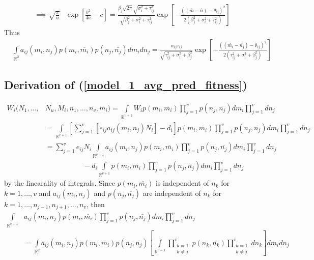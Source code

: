\documentclass{amsart}
\theoremstyle{definition}
\theoremstyle{remark}
\numberwithin{equation}{section}
\begin{document}
\begin{align*}
	\implies \sqrt{\frac{\pi}{a}}&\exp\left[\frac{b^2}{4a} - c\right] = \frac{\beta_j\sqrt{2\pi}\sqrt{\sigma_i^2 + \tau_{ij}^2}}{\sqrt{\beta_j^2 + \sigma_i^2 + \tau_{ij}^2}}\exp\left[-\frac{((\overline{m} - \overline{n}) - \theta_{ij})^2}{2(\beta_j^2 + \sigma_i^2 + \tau_{ij}^2)}\right]
\end{align*}
Thus
\begin{align*}
	&\int\limits_{\mathbb{R}^2}a_{ij}(m_i, n_j)p(m_i, \overline{m_i})p(n_j, \overline{n_j})dm_idn_j = \frac{\alpha_{ij}\tau_{ij}}{\sqrt{\tau_{ij}^2 + \sigma_i^2 + \beta_j^2}}\exp{\left[-\frac{((\overline{m_i} - \overline{n_j}) - \theta_{ij})^2}{2(\tau_{ij}^2 + \sigma_i^2 + \beta_j^2)}\right]}
\end{align*}
\subsection*{Derivation of (\ref{model_1_avg_pred_fitness})}
\begin{align*}
	\overline{W_i}(N_1, \dots, &N_u, M_i, \overline{n_1}, \dots, \overline{n_v}, \overline{m_i}) = \int\limits_{\mathbb{R}^{v+1}}^{}W_ip(m_i, \overline{m_i})\prod\limits_{j = 1}^{v}p(n_j, \overline{n_j})dm_i\prod\limits_{j = 1}^{v}dn_j \\
	&= \int\limits_{\mathbb{R}^{v+1}}^{}\left[\sum\limits_{j = 1}^{v}\left[e_{ij}a_{ij}(m_i, n_j)N_i\right] - d_i\right]p(m_i, \overline{m_i})\prod\limits_{j = 1}^{v}p(n_j, \overline{n_j})dm_i\prod\limits_{j = 1}^{v}dn_j \\
	&= \sum_{j=1}^{v}e_{ij}N_i\int\limits_{\mathbb{R}^{v+1}}^{}a_{ij}(m_i, n_j)p(m_i, \overline{m_i})\prod\limits_{j = 1}^{v}p(n_j, \overline{n_j})dm_i\prod\limits_{j = 1}^{v}dn_j \\
	&\ \ \ \ \ \ \ \ \ \ \ \ \ \ \ \ \ \ \ \ \ \ \ \ - d_i\int\limits_{\mathbb{R}^{v+1}}p(m_i, \overline{m_i})\prod\limits_{j = 1}^{v}p(n_j, \overline{n_j})dm_i\prod\limits_{j = 1}^{v}dn_j
\end{align*}
by the linearality of integrals.  Since $p(m_i, \overline{m_i})$ is independent of $n_k$ for $k = 1, \dots, v$ and $a_{ij}(m_i, n_j)$ and $p(n_j, \overline{n_j})$ are independent of $n_k$ for $k = 1, \dots, n_{j-1}, n_{j+1}, \dots, n_v$, then
\begin{align*}
	\int\limits_{\mathbb{R}^{v+1}}^{}&a_{ij}(m_i, n_j)p(m_i, \overline{m_i})\prod\limits_{j = 1}^{v}p(n_j, \overline{n_j})dm_i\prod\limits_{j = 1}^{v}dn_j \\
	&= \int\limits_{\mathbb{R}^2}a_{ij}(m_i, n_j)p(m_i, \overline{m_i})p(n_j, \overline{n_j})\left[\int\limits_{\mathbb{R}^{v-1}}\prod\limits_{\substack{k=1\\k\neq j}}^{v}p(n_k, \overline{n_k})\prod\limits_{\substack{k=1\\k\neq j}}^{v}dn_k\right]dm_idn_j
\end{align*}
\end{document}
